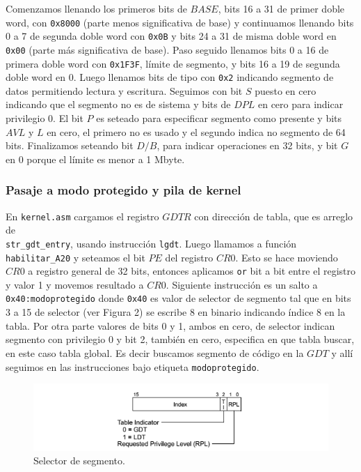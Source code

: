 Comenzamos llenando los primeros bits de $BASE$, bits 16 a 31 de primer doble word, con \verb|0x8000| (parte menos significativa de base) y continuamos llenando bits 0 a 7 de segunda doble word con \verb|0x0B| y bits 24 a 31 de misma doble word en \verb|0x00| (parte más significativa de base). Paso seguido llenamos bits 0 a 16 de primera doble word con \verb|0x1F3F|, límite de segmento, y bits 16 a 19 de segunda doble word en 0. Luego llenamos bits de tipo con \verb|0x2| indicando segmento de datos permitiendo lectura y escritura. Seguimos con bit $S$ puesto en cero indicando que el segmento no es de sistema y bits de $DPL$ en cero para indicar privilegio 0. El bit $P$ es seteado para especificar segmento como presente y bits $AVL$ y $L$ en cero, el primero no es usado y el segundo indica no segmento de 64 bits. Finalizamos seteando bit $D/B$, para indicar operaciones en 32 bits, y bit $G$ en 0 porque el límite es menor a 1 Mbyte.


\subsubsection{Pasaje a modo protegido y pila de kernel}
En \verb|kernel.asm| cargamos el registro $GDTR$ con dirección de tabla, que es arreglo de\\ \verb|str_gdt_entry|, usando instrucción \verb|lgdt|. Luego llamamos a función \verb|habilitar_A20| y seteamos el bit $PE$ del registro $CR0$. Esto se hace moviendo $CR0$ a registro general de 32 bits, entonces aplicamos \verb|or| bit a bit entre el registro y valor 1 y movemos resultado a $CR0$. Siguiente instrucción es un salto a \verb|0x40:modoprotegido| donde \verb|0x40| es valor de selector de segmento tal que en bits 3 a 15 de selector (ver Figura 2) se escribe 8 en binario indicando índice 8 en la tabla. Por otra parte valores de bits 0 y 1, ambos en cero, de selector indican segmento con privilegio 0 y bit 2, también en cero, especifica en que tabla buscar, en este caso tabla global. Es decir buscamos segmento de código en la $GDT$ y allí seguimos en las instrucciones bajo etiqueta \verb|modoprotegido|.
\begin{figure}[h]
\centering
\includegraphics[scale=0.6] {selector_segmento}
\caption{Selector de segmento.}
\end{figure} 

